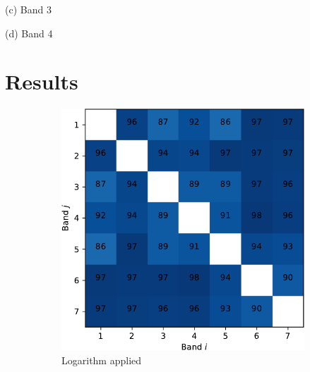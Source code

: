 \documentclass{article}
\begin{document}
\begin{minipage}[b]{.47\linewidth}
  \centering 
  \centerline{}
  \centerline{(c) Band 3}\medskip
\end{minipage}
\hfill
\begin{minipage}[b]{0.47\linewidth}
  \centering
  \centerline{}
  \centerline{(d) Band 4}\medskip
\end{minipage}

\section{Results}

\begin{figure}[h] 
  \begin{subfigure}[b]{0.49\linewidth}
    \centering
    \includegraphics[width=0.9\linewidth]{sup-crop.pdf} 
    \caption{Logarithm applied} 
    \label{fig7:a} 
  \end{subfigure}%
  \begin{subfigure}[b]{0.49\linewidth}
    \centering

\end{subfigure}
\end{figure}
\end{document}
